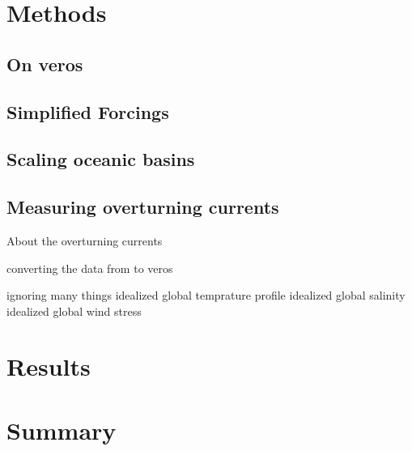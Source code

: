 \documentclass[a4paper]{article}
\begin{document}
\begin{multicols}{2}
\section{Methods}
\subsection{On veros}
\subsection{Simplified Forcings}
\subsection{Scaling oceanic basins}
\subsection{Measuring overturning currents}
About the overturning currents

converting the data from \cite{Muller2008Mar} to veros

ignoring many things
idealized global temprature profile
idealized global salinity
idealized global wind stress


\section{Results}

\section{Summary}

\printbibliography

\end{multicols}
\end{document}
